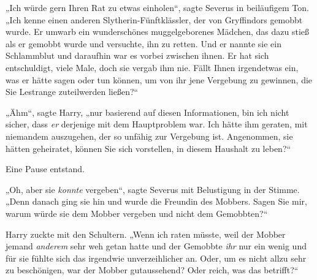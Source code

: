 „Ich würde gern Ihren Rat zu etwas einholen“, sagte Severus in beiläufigem Ton. „Ich kenne einen anderen Slytherin-Fünftklässler, der von Gryffindors gemobbt wurde. Er umwarb ein wunderschönes muggelgeborenes Mädchen, das dazu stieß als er gemobbt wurde und versuchte, ihn zu retten. Und er nannte sie ein Schlammblut und daraufhin war es vorbei zwischen ihnen. Er hat sich entschuldigt, viele Male, doch sie vergab ihm nie. Fällt Ihnen irgendetwas ein, was er hätte sagen oder tun können, um von ihr jene Vergebung zu gewinnen, die Sie Lestrange zuteilwerden ließen?“

„Ähm“, sagte Harry, „nur basierend auf diesen Informationen, bin ich nicht sicher, dass \emph{er} derjenige mit dem Hauptproblem war. Ich hätte ihm geraten, mit niemandem auszugehen, der so unfähig zur Vergebung ist. Angenommen, sie hätten geheiratet, können Sie sich vorstellen, in diesem Haushalt zu leben?“

Eine Pause entstand.

„Oh, aber sie \emph{konnte} vergeben“, sagte Severus mit Belustigung in der Stimme. „Denn danach ging sie hin und wurde die Freundin des Mobbers. Sagen Sie mir, warum würde sie dem Mobber vergeben und nicht dem Gemobbten?“

Harry zuckte mit den Schultern. „Wenn ich raten müsste, weil der Mobber jemand \emph{anderem} sehr weh getan hatte und der Gemobbte \emph{ihr} nur ein wenig und für sie fühlte sich das irgendwie unverzeihlicher an. Oder, um es nicht allzu sehr zu beschönigen, war der Mobber gutaussehend? Oder reich, was das betrifft?“

